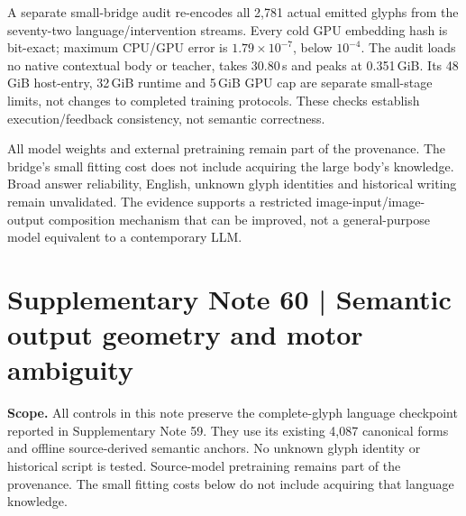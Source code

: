 \documentclass[10pt,a4paper]{article}
\providecommand{\DIFadd}[1]{{\protect\color{blue} \sf #1}} %
\providecommand{\DIFaddbegin}{} %
\begin{document}
A separate small-bridge audit re-encodes all 2,781 actual emitted glyphs from
the seventy-two language/intervention streams. Every cold GPU embedding hash
is bit-exact; maximum CPU/GPU error is $1.79\times10^{-7}$, below $10^{-4}$.
The audit loads no native contextual body or teacher, takes 30.80\,s and peaks
at 0.351\,GiB. Its 48\,GiB host-entry, 32\,GiB runtime and 5\,GiB GPU cap are
separate small-stage limits, not changes to completed training protocols.
These checks establish execution/feedback consistency, not semantic correctness.

All model weights and external pretraining remain part of the provenance.
The bridge's small fitting cost does not include acquiring the large body's
knowledge. Broad answer reliability, English, unknown glyph identities and
historical writing remain unvalidated. The evidence supports a restricted
image-input/image-output composition mechanism that can be improved, not a
general-purpose model equivalent to a contemporary LLM.

\clearpage
{}


\clearpage
\DIFaddbegin \section*{\DIFadd{Supplementary Note 60 | Semantic output geometry and motor ambiguity}}

\DIFadd{\textbf{Scope.}
All controls in this note preserve the complete-glyph language checkpoint
reported in Supplementary Note 59. They use its existing 4,087 canonical
forms and offline source-derived semantic anchors. No unknown glyph
identity or historical script is tested. Source-model pretraining remains
part of the provenance. The small fitting costs below do not include
acquiring that language knowledge.
}
\end{document}
